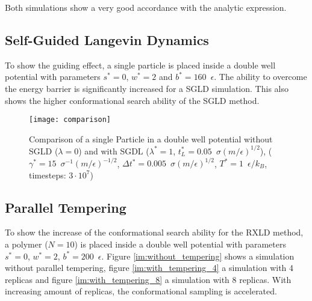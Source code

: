 \documentclass[a4paper]{article}
\begin{document}
Both simulations show a very good accordance with the analytic expression.

\begin{comment}
\subsection{Gaussian Chain}

The Gaussian distribution (equation \ref{eq:distribution2-rouse}) is checked with the distance between the first two beads of a polymer ($N = 10$) and compared to the analytic expression. The result is shown in figure \ref{im:distribution}.

\begin{figure} [H]
\centering
\scalebox{.6}{}
\caption{End-to-end distribution between the first and second bead ($\gamma^* = 1 \enspace \sigma^{-1} (m/\epsilon)^{-1/2}$, $N = 10$, $\Delta t^* = 0.001$, $T^* = 1 \enspace \sigma (m/\epsilon)^{1/2}$)}
\label{im:distribution}
\end{figure}
\end{comment}
\newpage
\subsection{Self-Guided Langevin Dynamics}

To show the guiding effect, a single particle is placed inside a double well potential with parameters $s^* = 0$, $w^* = 2$ and $b^* = 160 \enspace \epsilon$. The ability to overcome the energy barrier is significantly increased for a SGLD simulation. This also shows the higher conformational search ability of the SGLD method.

\begin{figure} [H]
\centering
\texttt{[image: comparison]}
\caption{Comparison of a single Particle in a double well potential without SGLD ($\lambda = 0$) and with SGDL ($\lambda^* = 1$, $t_L^* = 0.05 \enspace \sigma (m/\epsilon)^{1/2}$), ($\gamma^* = 15 \enspace \sigma^{-1} (m/\epsilon)^{-1/2}$, $\Delta t^* = 0.005 \enspace \sigma (m/\epsilon)^{1/2}$, $T^* = 1 \enspace \epsilon/k_B$, timesteps: $3 \cdot 10^7$)}
\label{im:verlet_boltzmann}
\end{figure}

\subsection{Parallel Tempering}

To show the increase of the conformational search ability for the RXLD method, a polymer ($N = 10$) is placed inside a double well potential with parameters $s^* = 0$, $w^* = 2$, $b^* = 200 \enspace \epsilon$. Figure \ref{im:without_tempering} shows a simulation without parallel tempering, figure \ref{im:with_tempering_4} a simulation with 4 replicas and figure \ref{im:with_tempering_8} a simulation with 8 replicas. With increasing amount of replicas, the conformational sampling is accelerated. 
\end{document}
